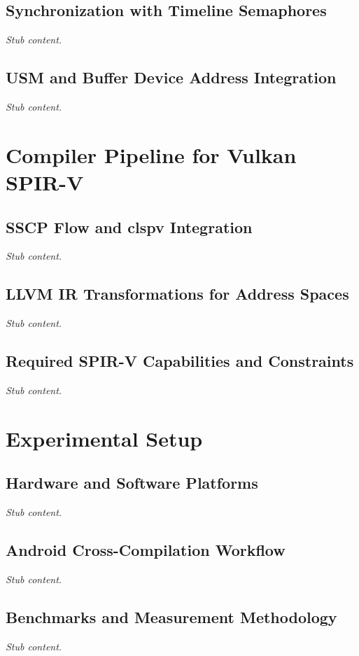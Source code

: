 \documentclass[sigconf]{acmart}
\begin{document}
\subsection{Synchronization with Timeline Semaphores}
\textit{Stub content.}

\subsection{USM and Buffer Device Address Integration}
\textit{Stub content.}

\section{Compiler Pipeline for Vulkan SPIR-V}
\subsection{SSCP Flow and clspv Integration}
\textit{Stub content.}

\subsection{LLVM IR Transformations for Address Spaces}
\textit{Stub content.}

\subsection{Required SPIR-V Capabilities and Constraints}
\textit{Stub content.}

\section{Experimental Setup}
\subsection{Hardware and Software Platforms}
\textit{Stub content.}

\subsection{Android Cross-Compilation Workflow}
\textit{Stub content.}

\subsection{Benchmarks and Measurement Methodology}
\textit{Stub content.}
\end{document}

